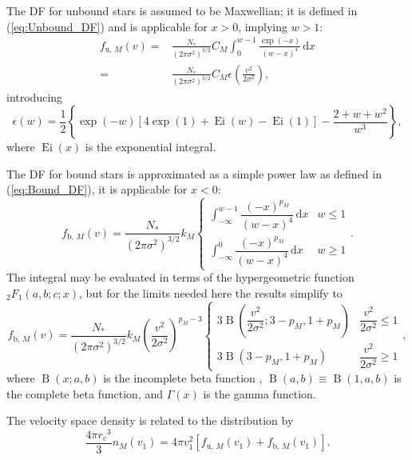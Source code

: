 \documentclass[useAMS,usedcolumn,usegraphicx,usenatbib]{mn2e}
\newcommand{\eqnref}[1]{(\ref{eq:#1})}
\DeclareMathOperator{\Ei}{Ei}
\DeclareMathOperator{\Beta}{B}
\newcommand{\sub}[1]{\ensuremath{_\mathrm{#1}}}
\newcommand{\dd}{\ensuremath{\mathrm{d}}}
\newcommand{\intd}[4]{\ensuremath{\displaystyle \int_{#1}^{#2}{#3}\,\dd{#4}}}
\newcommand{\recip}[1]{\ensuremath{\dfrac{1}{#1}}}
\begin{document}
\begin{onecolumn}
The DF for unbound stars is assumed to be Maxwellian; it is defined in \eqnref{Unbound_DF} and is applicable for $x > 0$, implying $w > 1$:
\begin{align}
f_{\mathrm{u},\,M}(v) = {} & \frac{N_\ast}{\left(2\pi\sigma^2\right)^{3/2}}C_M \intd{0}{w-1}{\frac{\exp(-x)}{(w-x)^4}}{x} \\
 = {} & \frac{N_\ast}{\left(2\pi\sigma^2\right)^{3/2}}C_M\epsilon\left(\frac{v^2}{2\sigma^2}\right),
\end{align}
introducing
\begin{equation}
\epsilon(w) = \recip{2}\left\{\exp(-w)\left[4\exp(1) + \Ei(w) - \Ei(1)\right] - \frac{2 + w + w^2}{w^3}\right\},
\end{equation}
where $\Ei(x)$ is the exponential integral.

The DF for bound stars is approximated as a simple power law as defined in \eqnref{Bound_DF}, it is applicable for $x < 0$:
\begin{equation}
f_{\mathrm{b},\,M}(v) = \frac{N_\ast}{\left(2\pi\sigma^2\right)^{3/2}}k_M\begin{cases}
\intd{-\infty}{w-1}{\dfrac{(-x)^{p_M}}{(w-x)^4}}{x} & w \leq 1 \\
\intd{-\infty}{0}{\dfrac{(-x)^{p_M}}{(w-x)^4}}{x} & w \geq 1
\end{cases}.
\end{equation}
The integral may be evaluated in terms of the hypergeometric function ${_2F_1(a,b;c;x)}$, but for the limits needed here the results simplify to
\begin{equation}
f_{\mathrm{b},\,M}(v) = \frac{N_\ast}{\left(2\pi\sigma^2\right)^{3/2}}k_M \left(\frac{v^2}{2\sigma^2}\right)^{p_M - 3}\begin{cases}
3 \Beta\left(\dfrac{v^2}{2\sigma^2}; 3 - p_M, 1 + p_M\right) & \dfrac{v^2}{2\sigma^2} \leq 1 \\
3 \Beta\left(3 - p_M, 1 + p_M\right) & \dfrac{v^2}{2\sigma^2} \geq 1
\end{cases},
\end{equation}
where $\Beta(x;a,b)$ is the incomplete beta function \citep[8.17]{Olver2010}, $\Beta(a,b) \equiv \Beta(1,a,b)$ is the complete beta function, and $\Gamma(x)$ is the gamma function.

The velocity space density is related to the distribution by
\begin{equation}
\frac{4\pi r\sub{c}^3}{3}n_M(v_1) = 4\pi v_1^2\left[f_{\mathrm{u},\,M}(v_1) + f_{\mathrm{b},\,M}(v_1)\right].
\end{equation}


\end{onecolumn}
\end{document}
